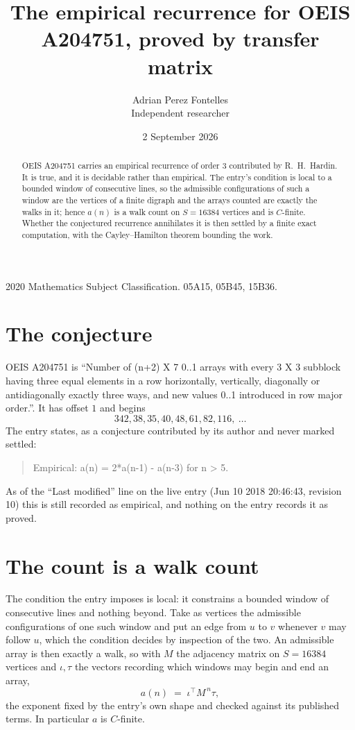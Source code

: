 \documentclass[11pt,a4paper]{article}
\title{The empirical recurrence for OEIS A204751, proved by transfer matrix}
\author{Adrian Perez Fontelles\\ \small Independent researcher}
\date{2 September 2026}
\theoremstyle{plain}
\theoremstyle{definition}
\begin{document}
\maketitle

\begin{abstract}
OEIS A204751 carries an empirical recurrence of order $3$ contributed by R.~H.~Hardin. It is
true, and it is decidable rather than empirical. The entry's condition is local to a bounded window of consecutive lines, so
the admissible configurations of such a window are the vertices of a finite digraph and the
arrays counted are exactly the walks in it; hence $a(n)$ is a walk count on $S=16384$ vertices
and is $C$-finite. Whether the conjectured recurrence annihilates it is then settled by a
finite exact computation, with the Cayley--Hamilton theorem bounding the work.
\end{abstract}

\noindent\small 2020 Mathematics Subject Classification. 05A15, 05B45, 15B36.\normalsize

\section{The conjecture}

OEIS A204751 is ``Number of (n+2) X 7 0..1 arrays with every 3 X 3 subblock having three equal elements in a row horizontally, vertically, diagonally or antidiagonally exactly three ways, and new values 0..1 introduced in row major order.''. It has offset $1$ and begins
\[
342, 38, 35, 40, 48, 61, 82, 116,\ \dots
\]
The entry states, as a conjecture contributed by its author and never marked settled:
\begin{quote}
Empirical: a(n) = 2*a(n-1) - a(n-3) for n > 5.
\end{quote}
As of the ``Last modified'' line on the live entry (Jun 10 2018 20:46:43, revision 10) this is still
recorded as empirical, and nothing on the entry records it as proved.

\section{The count is a walk count}

The condition the entry imposes is local: it constrains a bounded window of consecutive lines and nothing beyond. Take as
vertices the admissible configurations of one such window and put an edge from $u$ to $v$
whenever $v$ may follow $u$, which the condition decides by inspection of the two. An
admissible array is then exactly a walk, so with $M$ the adjacency matrix on $S=16384$ vertices
and $\iota,\tau$ the vectors recording which windows may begin and end an array,
\[
a(n)\;=\;\iota^{\!\top}M^{\,n}\tau ,
\]
the exponent fixed by the entry's own shape and checked against its published terms. In
particular $a$ is $C$-finite.
\end{document}
